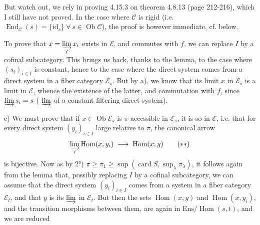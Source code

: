 \documentclass[11pt]{article}
\newcommand{\msp}[1]{\marginpar{\footnotesize [#1]}}
\newcommand{\cE}{\mathcal{E}}
\newcommand{\cC}{\mathcal{C}}
\newcommand{\Ob}{\operatorname{Ob}}
\newcommand{\Hom}{\operatorname{Hom}}
\newcommand{\End}{\operatorname{End}}
\newcommand{\Ens}{\mathrm{Ens}}
\newcommand{\id}{\mathrm{id}}
\newcommand{\card}{\operatorname{card}}
\begin{document}
But watch out, we rely in proving 4.15.3 on theorem 4.8.13 (page 212-216), which I still have not proved. In the case where $\cC$ is rigid (i.e. $\End_{\cC}(s) = \{\id_s\}\ \forall\ s \in \Ob\cC$), the proof is however immediate, cf. below.

\msp{page 429}
To prove that $x = \varinjlim\limits_{I} x_i$ exists in $\cE$, and commutes with $f$, we can replace $I$ by a cofinal subcategory. This brings us back, thanks to the lemma, to the case where $(s_i)_{i\in I}$ is constant, hence to the case where the direct system comes from a direct system in a fiber category $\cE_s$. But by a), we know that its limit $x$ in $\cE_s$ is a limit in $\cE$, whence the existence of the latter, and commutation with $f$, since $\varinjlim s_i = s$ ( $\varinjlim$ of a constant filtering direct system).

c) We must prove that if $x \in \Ob\cE_s$ is $\pi$-accessible in $\cE_s$, it is so in $\cE$, i.e. that for every direct system $(y_i)_{i\in I}$ large relative to $\pi$, the canonical arrow
\[
\varinjlim_{i} \Hom(x,y_i) \;\longrightarrow\; \Hom(x,y) \tag*{$(**)$}
\]
is bijective. Now as by 2°) $\pi \geqslant \pi_1 \geqslant \sup(\card S, \sup_\lambda \pi_\lambda)$, it follows again from the lemma %
that, possibly replacing $I$ by a cofinal subcategory, we can assume that the direct system $(y_i)_{i\in I}$ comes from a system in a fiber category $\cE_t$, and that $y$ is its $\varinjlim$ in $\cE_t$. But then the sets $\Hom(x,y)$ and $\Hom(x,y_i)$, and the transition morphisms between them, are again in $\Ens/\Hom(s,t)$, and we are reduced
\end{document}
